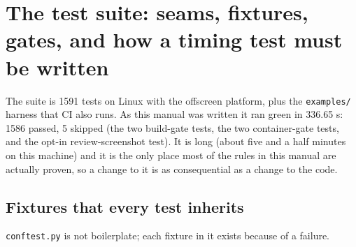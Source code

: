 \chapter{The test suite: seams, fixtures, gates, and how a timing test must be written}\label{ch:tests}

The suite is 1591 tests on Linux with the offscreen platform, plus the \texttt{examples/} harness that
CI also runs. As this manual was written it ran green in 336.65 s: 1586 passed, 5 skipped (the two
build-gate tests, the two container-gate tests, and the opt-in review-screenshot test). It is long
(about five and a half minutes on this machine) and it is the only place most of the rules in this
manual are actually proven, so a change to it is as consequential as a change to the code.

\section{Fixtures that every test inherits}

\texttt{conftest.py} is not boilerplate; each fixture in it exists because of a failure.

